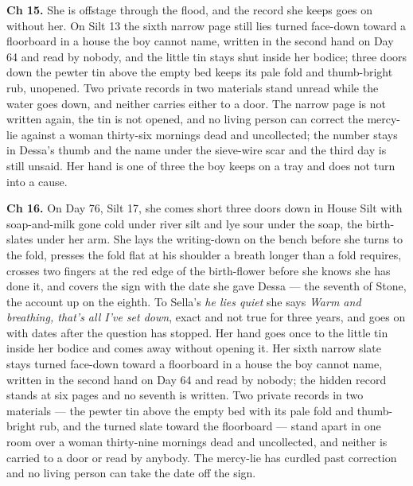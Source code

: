 \documentclass{design/chronicle}
\begin{document}
{\textbf{Ch 15.} She is offstage through the flood, and the record she keeps goes on without her. On Silt 13 the sixth narrow page still lies turned face-down toward a floorboard in a house the boy cannot name, written in the second hand on Day 64 and read by nobody, and the little tin stays shut inside her bodice; three doors down the pewter tin above the empty bed keeps its pale fold and thumb-bright rub, unopened. Two private records in two materials stand unread while the water goes down, and neither carries either to a door. The narrow page is not written again, the tin is not opened, and no living person can correct the mercy-lie against a woman thirty-six mornings dead and uncollected; the number stays in Dessa’s thumb and the name under the sieve-wire scar and the third day is still unsaid. Her hand is one of three the boy keeps on a tray and does not turn into a cause.

\textbf{Ch 16.} On Day 76, Silt 17, she comes short three doors down in House Silt with soap-and-milk gone cold under river silt and lye sour under the soap, the birth-slates under her arm. She lays the writing-down on the bench before she turns to the fold, presses the fold flat at his shoulder a breath longer than a fold requires, crosses two fingers at the red edge of the birth-flower before she knows she has done it, and covers the sign with the date she gave Dessa --- the seventh of Stone, the account up on the eighth. To Sella’s \emph{he lies quiet} she says \emph{Warm and breathing, that’s all I’ve set down}, exact and not true for three years, and goes on with dates after the question has stopped. Her hand goes once to the little tin inside her bodice and comes away without opening it. Her sixth narrow slate stays turned face-down toward a floorboard in a house the boy cannot name, written in the second hand on Day 64 and read by nobody; the hidden record stands at six pages and no seventh is written. Two private records in two materials --- the pewter tin above the empty bed with its pale fold and thumb-bright rub, and the turned slate toward the floorboard --- stand apart in one room over a woman thirty-nine mornings dead and uncollected, and neither is carried to a door or read by anybody. The mercy-lie has curdled past correction and no living person can take the date off the sign.

}
\end{document}
